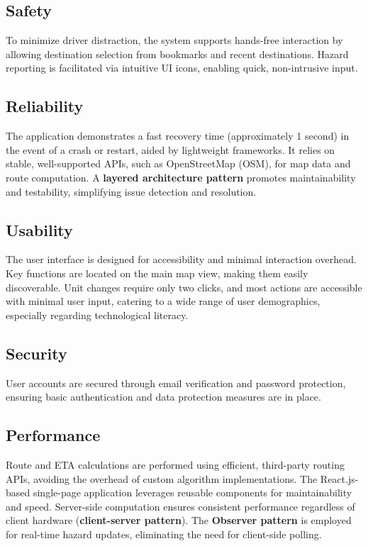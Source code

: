\documentclass{article}
\begin{document}
\subsection*{Safety}
To minimize driver distraction, the system supports hands-free interaction by allowing destination selection from bookmarks and recent destinations. Hazard reporting is facilitated via intuitive UI icons, enabling quick, non-intrusive input.

\subsection*{Reliability}
The application demonstrates a fast recovery time (approximately 1 second) in the event of a crash or restart, aided by lightweight frameworks. It relies on stable, well-supported APIs, such as OpenStreetMap (OSM), for map data and route computation. A \textbf{layered architecture pattern} promotes maintainability and testability, simplifying issue detection and resolution.

\subsection*{Usability}
The user interface is designed for accessibility and minimal interaction overhead. Key functions are located on the main map view, making them easily discoverable. Unit changes require only two clicks, and most actions are accessible with minimal user input, catering to a wide range of user demographics, especially regarding technological literacy.

\subsection*{Security}
User accounts are secured through email verification and password protection, ensuring basic authentication and data protection measures are in place.

\subsection*{Performance}
Route and ETA calculations are performed using efficient, third-party routing APIs, avoiding the overhead of custom algorithm implementations. The React.js-based single-page application leverages reusable components for maintainability and speed. Server-side computation ensures consistent performance regardless of client hardware (\textbf{client-server pattern}). The \textbf{Observer pattern} is employed for real-time hazard updates, eliminating the need for client-side polling.
\end{document}
